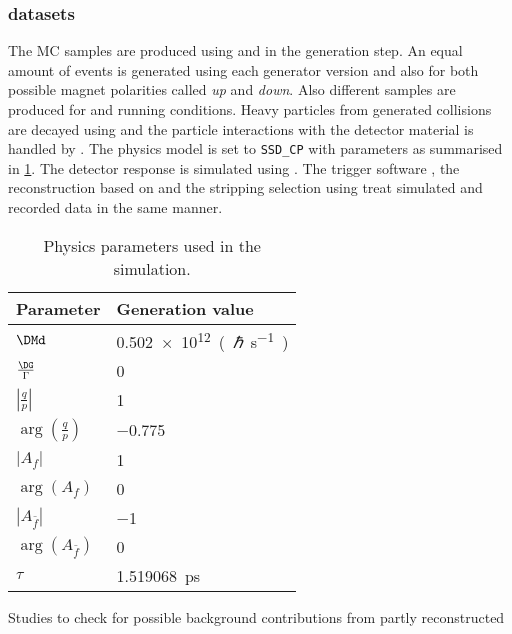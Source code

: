 \subsubsection{\MC datasets}
\label{sec:measurement_of_sin2beta:data_preparation:datasamples:mc}

The \acf{MC} samples are produced using \PythiaSix and \PythiaEight in the
generation step. An equal amount of events is generated using each generator
version and also for both possible magnet polarities called \emph{up} and
\emph{down}. Also different samples are produced for \catOO and \catOT running
conditions. Heavy particles from generated \protonproton collisions are decayed
using \EvtGen and the particle interactions with the \LHCb detector material is
handled by \GeantFour. The \EvtGen physics model is set to \Verb=SSD_CP= with
parameters as summarised in
\cref{tab:measurement_of_sin2beta:data_preparation:datasamples:mc:decfile}. The
detector response is simulated using \Boole. The \LHCb trigger software \Moore,
the reconstruction based on \Brunel and the stripping selection using \DaVinci
treat simulated and recorded data in the same manner.
%
\begin{table}
\centering
\caption{Physics parameters used in the simulation.}
\label{tab:measurement_of_sin2beta:data_preparation:datasamples:mc:decfile}
\begin{tabular}{ll}
\toprule
Parameter                            & Generation value \\
\midrule
$\DMd$                               & \SI{0.502e12}{(\planckbar\per\second)} \\
$\frac{\DG}{\Gamma}$                 & \num{0} \\
$\left\vert\frac{q}{p}\right\vert$   & \num{1} \\
$\arg(\frac{q}{p})$                  & \num{-0.775} \\
$\vert A_f \vert$                    & \num{1} \\
$\arg(A_f)$                          & \num{0} \\
$\left\vert A_{\bar{f}} \right\vert$ & \num{-1}  \\
$\arg(A_{\bar{f}})$                  & \num{0} \\
$\tau$                               & \SI{1.519068}{\pico\second}\\
\bottomrule
\end{tabular}
\end{table}
%
Studies to check for possible background contributions from partly reconstructed
